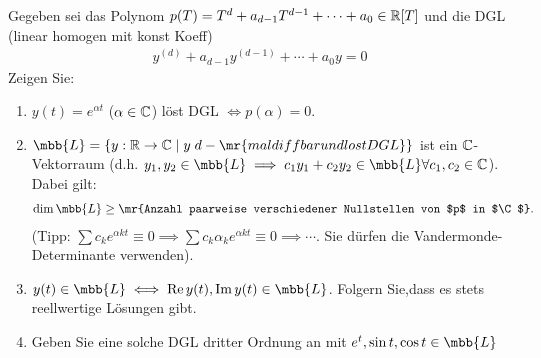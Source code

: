\documentclass[ngerman]{report}
\begin{document}
\begin{question}
    Gegeben sei das Polynom $p(T) = T^d +a_{d-1}T^{d-1} +\cdots+a_0 \in \mathbb{R}[T]$ und die DGL (linear homogen mit konst Koeff)
    \begin{align*}
        y^{(d)} + a_{d-1}y^{(d-1)} + \cdots + a_0y = 0
    \end{align*}
    Zeigen Sie:
    \begin{enumerate}
        \item $y(t)=e^{\alpha t}$ ($\alpha\in\mathbb{C}$) löst DGL $\iff p(\alpha)=0.$
        \item  $\mbb{L}=\{y: \R\to\C \mid y \; d-\mr{mal diffbar und lost DGL}\}$ ist ein $\mathbb{C}$-Vektorraum (d.h. $y_1,y_2\in\mbb{L}\implies c_1y_1+c_2y_2\in\mbb{L}\forall c_1,c_2\in\C$). Dabei gilt:
        \begin{align*}
            \dim \mbb{L} \geq \mr{Anzahl paarweise verschiedener Nullstellen von $p$ in $\C$}.
        \end{align*}
        (Tipp: $\sum c_ke^{\alpha kt} \equiv 0\implies \sum c_k\alpha_k e^{\alpha kt} \equiv 0\implies\cdots.$ Sie dürfen die Vandermonde-Determinante verwenden).
        \item $y(t)\in\mbb{L}\iff \Re y(t),\Im y(t)\in\mbb{L}$. Folgern Sie,dass es stets reellwertige Lösungen gibt.
        \item Geben Sie eine solche DGL dritter Ordnung an mit $e^t,\sin t,\cos t\in\mbb{L}$
    \end{enumerate}        
\end{question}
\begin{answer}
\end{answer}
\end{document}
